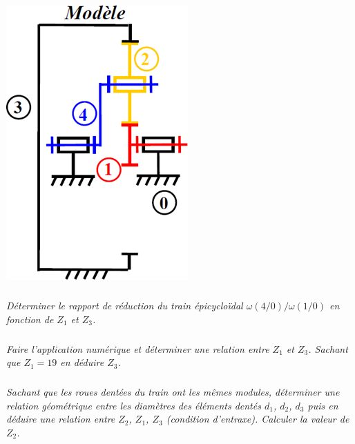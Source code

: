 \documentclass[10pt,oneside]{article}
\begin{document}
\begin{minipage}[c]{.32\linewidth}
\begin{center}
 \includegraphics[width=.85\textwidth]{png/secateur3}
\end{center}
\end{minipage} \hfill
\begin{minipage}[c]{.55\linewidth}


\subparagraph{}
\textit{Déterminer le rapport de réduction du train épicycloïdal $\omega(4/0)/\omega(1/0)$ en fonction de $Z_1$ et $Z_3$.}

\subparagraph{}
\textit{Faire l’application numérique et déterminer une relation entre $Z_1$ et $Z_3$. Sachant que $Z_1=19$ en déduire $Z_3$.}

\subparagraph{}
\textit{Sachant que les roues dentées du train ont les mêmes modules, déterminer une relation géométrique entre les diamètres des éléments dentés $d_1$, $d_2$, $d_3$ puis en déduire une relation entre $Z_2$, $Z_1$, $Z_3$ (condition d’entraxe). Calculer la valeur de $Z_2$.}


\end{minipage}
\end{document}
